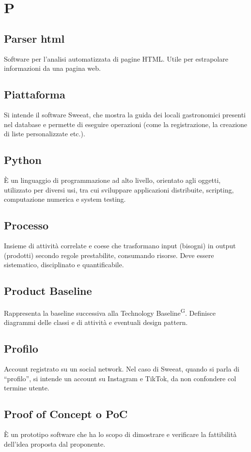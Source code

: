 \section{P}

\subsection{Parser html}
Software per l'analisi automatizzata di pagine HTML. Utile per estrapolare informazioni da una pagina web.

\subsection{Piattaforma} Si intende il software Sweeat, che mostra la guida dei locali gastronomici presenti nel database e permette di eseguire operazioni (come la registrazione, la creazione di liste personalizzate etc.).

\subsection{Python} 
È un linguaggio di programmazione ad alto livello, orientato agli oggetti, utilizzato per diversi usi, tra cui sviluppare applicazioni distribuite, scripting, computazione numerica e system testing. 

\subsection{Processo}
Insieme di attività correlate e coese che trasformano input (bisogni) in output (prodotti) secondo regole prestabilite, consumando risorse. Deve essere sistematico, disciplinato e quantificabile.

\subsection{Product Baseline}
Rappresenta la baseline successiva alla Technology Baseline\textsuperscript{G}. Definisce diagrammi delle classi e di attività e eventuali design pattern. 

\subsection{Profilo} Account registrato su un social network. Nel caso di Sweeat, quando si parla di “profilo”, si intende un account su Instagram e TikTok, da non confondere col termine utente.

\subsection{Proof of Concept o PoC}
È un prototipo software che ha lo scopo di dimostrare e verificare la fattibilità dell'idea proposta dal proponente.


